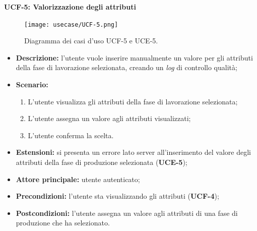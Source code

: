         \textbf{UCF-5: Valorizzazione degli attributi}
        \begin{figure}[H]
            \centering
            \texttt{[image: usecase/UCF-5.png]}
            \caption{Diagramma dei casi d'uso UCF-5 e UCE-5.}
        \end{figure}
        \begin{itemize}
            \item \textbf{Descrizione:} l’utente vuole inserire manualmente un valore per gli attributi della fase di lavorazione selezionata, creando un \textit{log} di controllo qualità;
            \item \textbf{Scenario:}
                \begin{enumerate}
                    \item L’utente visualizza gli attributi della fase di lavorazione selezionata;
                    \item L'utente assegna un valore agli attributi visualizzati;
                    \item L'utente conferma la scelta.
                \end{enumerate}
            \item \textbf{Estensioni:} si presenta un errore lato server all’inserimento del valore degli attributi della fase di produzione selezionata (\textbf{UCE-5});
            \item \textbf{Attore principale:} utente autenticato;
            \item \textbf{Precondizioni:} l’utente sta visualizzando gli attributi (\textbf{UCF-4});
            \item \textbf{Postcondizioni:} l’utente assegna un valore agli attributi di una fase di produzione che ha selezionato.
        \end{itemize}


